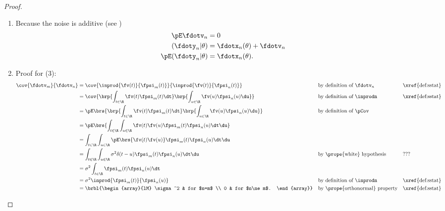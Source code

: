 \begin{proof}
\begin{enumerate}
  \item Because the noise is additive (see )
    \begin{align*}
       \pE\fdotv_{n}           &= 0  \\
       (\fdoty_n |\theta)      &= \fdotx_n(\theta)  + \fdotv_n \\
       \pE({\fdoty_n} | \theta) &= \fdotx_n(\theta).
    \end{align*}

  \item Proof for (3):
\begin{align*}
   \cov{\fdotv_m}{\fdotv_n}
      &= \cov{\inprod{\fv(t)}{\fpsi_m(t)}}{\inprod{\fv(t)}{\fpsi_n(t)}}
      && \text{by definition of $\fdotv_n$}
      && \text{\xref{def:sstat}}
    \\&= \cov{\brp{\int_{t\in\R} \fv(t) \fpsi_m(t)\dt} 
              \brp{\int_{u\in\R} \fv(u) \fpsi_n(u)\du}}
      && \text{by definition of $\inprodn$}
      && \text{\xref{def:sstat}}
    \\&= \pE\brs{\brp{\int_{t\in\R} \fv(t) \fpsi_m(t)\dt} 
              \brp{\int_{u\in\R} \fv(u) \fpsi_n(u)\du}}
      && \text{by definition of $\pCov$}
    \\&= \pE\brs{\int_{t\in\R}\int_{u\in\R} \fv(t)\fv(u) \fpsi_m(t) \fpsi_n(u) \dt\du} 
    \\&= \int_{t\in\R}\int_{u\in\R} \pE\brs{\fv(t)\fv(u)} \fpsi_m(t) \fpsi_n(u) \dt\du
    \\&= \int_{t\in\R}\int_{u\in\R} \sigma^2\delta(t-u) \fpsi_m(t) \fpsi_n(u) \dt\du
      && \text{by \prope{white} hypothesis}
      && \text{???}
    \\&= \sigma^2 \int_{t\in\R}  \fpsi_m(t) \fpsi_n(u) \dt
    \\&= \sigma^2 \inprod{\fpsi_m(t)}{\fpsi_n(u)}
      && \text{by definition of $\inprodn$}
      && \text{\xref{def:sstat}}
    \\&= \brbl{\begin{array}{lM}
             \sigma^2 & for $n=m$ \\
             0        & for $n\ne m$.
          \end{array}}
      && \text{by \prope{orthonormal} property}
      && \text{\xref{def:sstat}}
  \end{align*}
  

\end{enumerate}
\end{proof}

